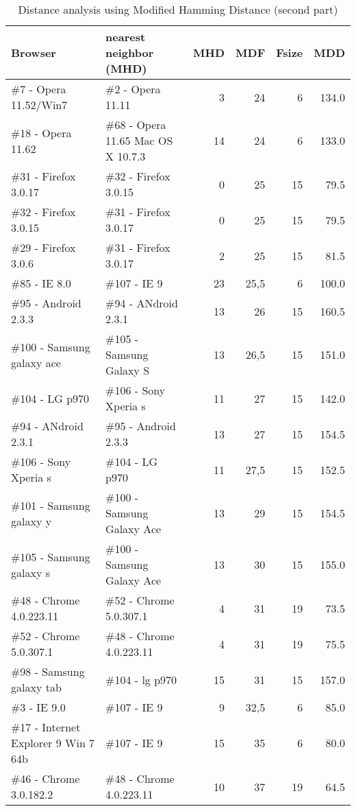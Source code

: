 \documentclass[10pt]{IEEEtran}
\begin{document}
\begin{table*}[h]
  \centering
  \caption{Distance analysis using Modified Hamming Distance (second part)}
    \begin{tabular}{llrrrr}
    \hline
    Browser & nearest neighbor (MHD) & MHD   & MDF   & Fsize & MDD \\
    \hline
    \#7 - Opera 11.52/Win7 & \#2 - Opera 11.11 & 3     & 24    & 6     & 134.0 \\
    \#18 - Opera 11.62 & \#68 - Opera 11.65 Mac OS X 10.7.3 & 14    & 24    & 6     & 133.0 \\
    \#31 - Firefox 3.0.17 & \#32 - Firefox 3.0.15 & 0     & 25    & 15    & 79.5 \\
    \#32 - Firefox 3.0.15 & \#31 - Firefox 3.0.17 & 0     & 25    & 15    & 79.5 \\
    \#29 - Firefox 3.0.6 & \#31 - Firefox 3.0.17 & 2     & 25    & 15    & 81.5 \\
    \#85 - IE 8.0 & \#107 - IE 9 & 23    & 25,5  & 6     & 100.0 \\
    \#95 - Android 2.3.3 & \#94 - ANdroid 2.3.1 & 13    & 26    & 15    & 160.5 \\
    \#100 - Samsung galaxy ace & \#105 - Samsung Galaxy S & 13    & 26,5  & 15    & 151.0 \\
    \#104 - LG p970 & \#106 - Sony Xperia s & 11    & 27    & 15    & 142.0 \\
    \#94 - ANdroid 2.3.1 & \#95 - Android 2.3.3 & 13    & 27    & 15    & 154.5 \\
    \#106 - Sony Xperia s & \#104 - LG p970 & 11    & 27,5  & 15    & 152.5 \\
    \#101 - Samsung galaxy y & \#100 - Samsung Galaxy Ace & 13    & 29    & 15    & 154.5 \\
    \#105 - Samsung galaxy s & \#100 - Samsung Galaxy Ace & 13    & 30    & 15    & 155.0 \\
    \#48 - Chrome 4.0.223.11 & \#52 - Chrome 5.0.307.1 & 4     & 31    & 19    & 73.5 \\
    \#52 - Chrome 5.0.307.1 & \#48 - Chrome 4.0.223.11 & 4     & 31    & 19    & 75.5 \\
    \#98 - Samsung galaxy tab & \#104 - lg p970 & 15    & 31    & 15    & 157.0 \\
    \#3 - IE 9.0 & \#107 - IE 9 & 9     & 32,5  & 6     & 85.0 \\
    \#17 - Internet Explorer 9 Win 7 64b & \#107 - IE 9 & 15    & 35    & 6     & 80.0 \\
    \#46 - Chrome 3.0.182.2 & \#48 - Chrome 4.0.223.11 & 10    & 37    & 19    & 64.5 \\

\end{tabular}
\end{table*}
\end{document}
